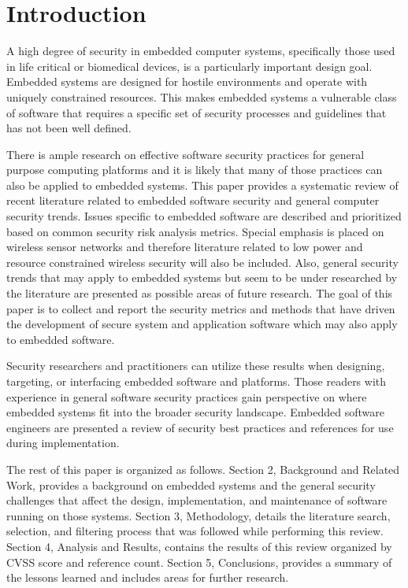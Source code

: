 \documentclass[final,conference,10pt]{IEEEtran}
\begin{document}
\section{Introduction} 

A high degree of security in embedded computer systems, specifically those used in life critical or biomedical devices, is a particularly important design goal.  Embedded systems are designed for hostile environments and operate with uniquely constrained resources. This makes embedded systems a vulnerable class of software that requires a specific set of security processes and guidelines that has not been well defined.   

There is ample research on effective software security practices for general purpose computing platforms and it is likely that many of those practices can also be applied to embedded systems. This paper provides a systematic review of recent literature related to embedded software security and general computer security trends. Issues specific to embedded software are described and prioritized based on common security risk analysis metrics.  Special emphasis is placed on wireless sensor networks and therefore literature related to low power and resource constrained wireless security will also be included.  Also, general security trends that may apply to embedded systems but seem to be under researched by the literature are presented as possible areas of future research.  The goal of this paper is to collect and report the security metrics and methods that have driven the development of secure system and application software which may also apply to embedded software.

Security researchers and practitioners can utilize these results when designing, targeting, or interfacing embedded software and platforms.  Those readers with experience in general software security practices gain perspective on where embedded systems fit into the broader security landscape.  Embedded software engineers are presented a review of security best practices and references for use during implementation.

The rest of this paper is organized as follows. Section 2, Background and Related Work, provides a background on embedded systems and the general security challenges that affect the design, implementation, and maintenance of software running on those systems. Section 3, Methodology, details the literature search, selection, and filtering process that was followed while performing this review. Section 4, Analysis and Results, contains the results of this review organized by CVSS score and reference count. Section 5, Conclusions, provides a summary of the lessons learned and includes areas for further research.
\end{document}
